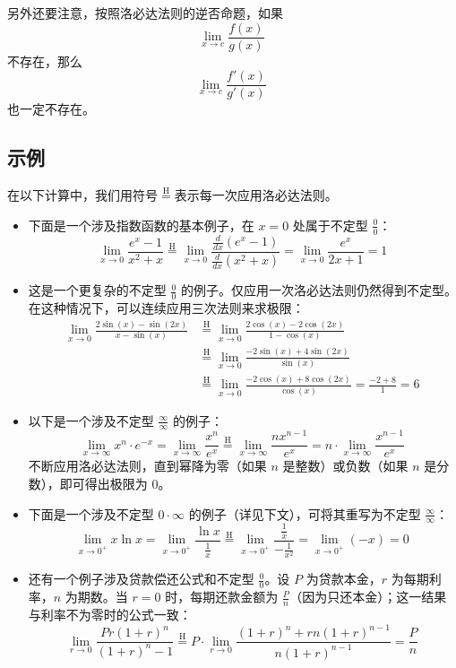 另外还要注意，按照洛必达法则的逆否命题，如果
$$
\lim_{x \to c} \frac{f(x)}{g(x)}~
$$
不存在，那么
$$
\lim_{x \to c} \frac{f'(x)}{g'(x)}~
$$
也一定不存在。
\subsection{示例}
在以下计算中，我们用符号$\stackrel{\mathrm{H}}{=}$表示每一次应用洛必达法则。

\begin{itemize}
\item 下面是一个涉及指数函数的基本例子，在 $x = 0$ 处属于不定型 $\frac{0}{0}$：
$$
\lim_{x \to 0} \frac{e^x - 1}{x^2 + x}
\stackrel{\mathrm{H}}{=}
\lim_{x \to 0} \frac{\frac{d}{dx}(e^x - 1)}{\frac{d}{dx}(x^2 + x)}
=
\lim_{x \to 0} \frac{e^x}{2x + 1}
= 1~
$$
\item 这是一个更复杂的不定型 $\frac{0}{0}$ 的例子。仅应用一次洛必达法则仍然得到不定型。在这种情况下，可以连续应用三次法则来求极限：
$$
\begin{aligned}
\lim_{x \to 0} \frac{2\sin(x) - \sin(2x)}{x - \sin(x)}
&\stackrel{\mathrm{H}}{=}
\lim_{x \to 0} \frac{2\cos(x) - 2\cos(2x)}{1 - \cos(x)} \\
&\stackrel{\mathrm{H}}{=}
\lim_{x \to 0} \frac{-2\sin(x) + 4\sin(2x)}{\sin(x)} \\
&\stackrel{\mathrm{H}}{=}
\lim_{x \to 0} \frac{-2\cos(x) + 8\cos(2x)}{\cos(x)} =
\frac{-2 + 8}{1} = 6
\end{aligned}~
$$
\item 以下是一个涉及不定型 $\frac{\infty}{\infty}$ 的例子：
$$
\lim_{x \to \infty} x^n \cdot e^{-x}
=
\lim_{x \to \infty} \frac{x^n}{e^x}
\stackrel{\mathrm{H}}{=}
\lim_{x \to \infty} \frac{n x^{n-1}}{e^x}
= n \cdot \lim_{x \to \infty} \frac{x^{n-1}}{e^x}~
$$
不断应用洛必达法则，直到幂降为零（如果 $n$ 是整数）或负数（如果 $n$ 是分数），即可得出极限为 0。
\item 下面是一个涉及不定型 $0 \cdot \infty$ 的例子（详见下文），可将其重写为不定型 $\frac{\infty}{\infty}$：
$$
\lim_{x \to 0^+} x \ln x
=
\lim_{x \to 0^+} \frac{\ln x}{\frac{1}{x}}
\stackrel{\mathrm{H}}{=}
\lim_{x \to 0^+} \frac{\frac{1}{x}}{-\frac{1}{x^2}}
=
\lim_{x \to 0^+} (-x) = 0~
$$
\item 还有一个例子涉及贷款偿还公式和不定型 $\frac{0}{0}$。设 $P$ 为贷款本金，$r$ 为每期利率，$n$ 为期数。当 $r = 0$ 时，每期还款金额为 $\frac{P}{n}$（因为只还本金）；这一结果与利率不为零时的公式一致：
$$
\lim_{r \to 0} \frac{Pr(1+r)^n}{(1+r)^n - 1}
\stackrel{\mathrm{H}}{=}
P \cdot \lim_{r \to 0} \frac{(1+r)^n + rn(1+r)^{n-1}}{n(1+r)^{n-1}} = \frac{P}{n}~
$$
\end{itemize}
